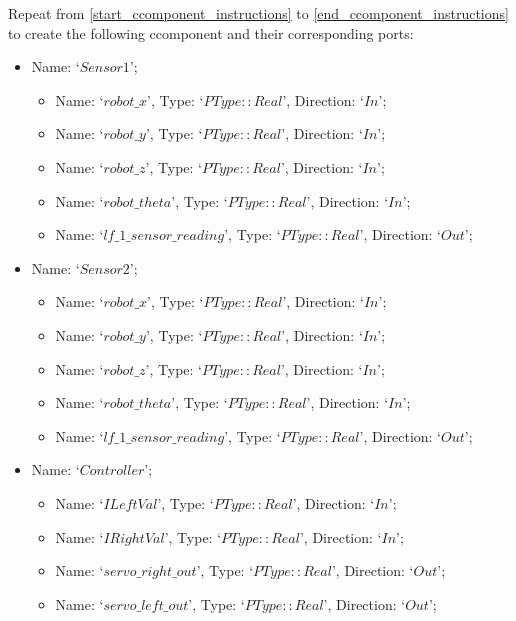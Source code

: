 \documentclass[11pt,a4paper]{../tutorial}
\begin{document}
\begin{instructions}
\item Repeat from \ref{start_ccomponent_instructions}  to \ref{end_ccomponent_instructions} to create the following ccomponent and their corresponding ports:
\begin{itemize}
	\item Name: `$Sensor1$';
	\begin{itemize}
		\item Name: `$robot\_x$', Type: `$PType::Real$', Direction:  `$In$';
		\item Name: `$robot\_y$', Type: `$PType::Real$', Direction:  `$In$';
		\item Name: `$robot\_z$', Type: `$PType::Real$', Direction:  `$In$';
		\item Name: `$robot\_theta$', Type: `$PType::Real$', Direction:  `$In$';
		\item Name: `$lf\_1\_sensor\_reading$', Type: `$PType::Real$', Direction:  `$Out$';
	\end{itemize}
\end{itemize}

\begin{itemize}
	\item Name: `$Sensor2$';
	\begin{itemize}
	\item Name: `$robot\_x$', Type: `$PType::Real$', Direction:  `$In$';
	\item Name: `$robot\_y$', Type: `$PType::Real$', Direction:  `$In$';
	\item Name: `$robot\_z$', Type: `$PType::Real$', Direction:  `$In$';
	\item Name: `$robot\_theta$', Type: `$PType::Real$', Direction:  `$In$';
	\item Name: `$lf\_1\_sensor\_reading$', Type: `$PType::Real$', Direction:  `$Out$';
\end{itemize}
\end{itemize}


\begin{itemize}
	\item Name: `$Controller$';
	\begin{itemize}
	\item Name: `$ILeftVal$', Type: `$PType::Real$', Direction:  `$In$';
	\item Name: `$IRightVal$', Type: `$PType::Real$', Direction:  `$In$';
	\item Name: `$servo\_right\_out$', Type: `$PType::Real$', Direction:  `$Out$';
	\item Name: `$servo\_left\_out$', Type: `$PType::Real$', Direction:  `$Out$';
\end{itemize}
\end{itemize}


\end{instructions}
\end{document}
